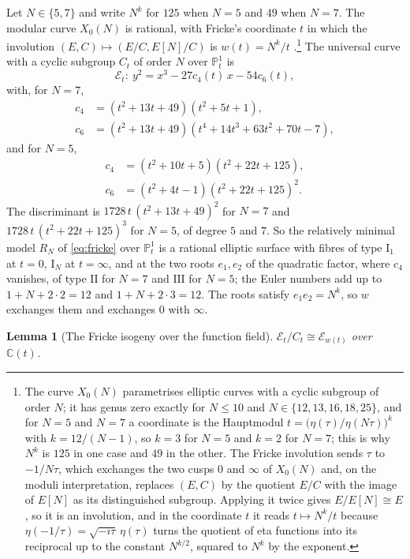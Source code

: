 \documentclass[11pt,reqno]{amsart}
\numberwithin{equation}{section}
\theoremstyle{plain}
\newtheorem{lemma}[theorem]{Lemma}
\theoremstyle{definition}
\newcommand{\CC}{\mathbb{C}}
\newcommand{\PP}{\mathbb{P}}
\begin{document}
Let $N\in\{5,7\}$ and write $N^{k}$ for $125$ when $N=5$ and $49$ when $N=7$. The modular curve $X_{0}(N)$ is rational, with Fricke's coordinate $t$ in which the involution $(E,C)\mapsto(E/C,E[N]/C)$ is $w(t)=N^{k}/t$ \cite[\S7.6]{vGS25}.\footnote{The curve $X_{0}(N)$ parametrises elliptic curves with a cyclic subgroup of order $N$; it has genus zero exactly for $N\le10$ and $N\in\{12,13,16,18,25\}$, and for $N=5$ and $N=7$ a coordinate is the Hauptmodul $t=\bigl(\eta(\tau)/\eta(N\tau)\bigr)^{k}$ with $k=12/(N-1)$, so $k=3$ for $N=5$ and $k=2$ for $N=7$; this is why $N^{k}$ is $125$ in one case and $49$ in the other. The Fricke involution sends $\tau$ to $-1/N\tau$, which exchanges the two cusps $0$ and $\infty$ of $X_{0}(N)$ and, on the moduli interpretation, replaces $(E,C)$ by the quotient $E/C$ with the image of $E[N]$ as its distinguished subgroup. Applying it twice gives $E/E[N]\cong E$, so it is an involution, and in the coordinate $t$ it reads $t\mapsto N^{k}/t$ because $\eta(-1/\tau)=\sqrt{-i\tau}\,\eta(\tau)$ turns the quotient of eta functions into its reciprocal up to the constant $N^{k/2}$, squared to $N^{k}$ by the exponent.} The universal curve with a cyclic subgroup $C_{t}$ of order $N$ over $\PP^{1}_{t}$ is
\begin{equation}\label{eq:fricke}
\mathcal{E}_{t}\colon\ y^{2}=x^{3}-27c_{4}(t)\,x-54c_{6}(t),
\end{equation}
with, for $N=7$,
\begin{align*}
c_{4}&=(t^{2}+13t+49)(t^{2}+5t+1),\\
c_{6}&=(t^{2}+13t+49)(t^{4}+14t^{3}+63t^{2}+70t-7),
\end{align*}
and for $N=5$,
\begin{align*}
c_{4}&=(t^{2}+10t+5)(t^{2}+22t+125),\\
c_{6}&=(t^{2}+4t-1)(t^{2}+22t+125)^{2}.
\end{align*}
The discriminant is $1728\,t\,(t^{2}+13t+49)^{2}$ for $N=7$ and $1728\,t\,(t^{2}+22t+125)^{3}$ for $N=5$, of degree $5$ and $7$. So the relatively minimal model $R_{N}$ of \eqref{eq:fricke} over $\PP^{1}_{t}$ is a rational elliptic surface with fibres of type $\mathrm{I}_{1}$ at $t=0$, $\mathrm{I}_{N}$ at $t=\infty$, and at the two roots $e_{1},e_{2}$ of the quadratic factor, where $c_{4}$ vanishes, of type $\mathrm{II}$ for $N=7$ and $\mathrm{III}$ for $N=5$; the Euler numbers add up to $1+N+2\cdot2=12$ and $1+N+2\cdot3=12$. The roots satisfy $e_{1}e_{2}=N^{k}$, so $w$ exchanges them and exchanges $0$ with $\infty$.

\begin{lemma}[The Fricke isogeny over the function field]\label{lem:fricke}
$\mathcal{E}_{t}/C_{t}\cong\mathcal{E}_{w(t)}$ over $\CC(t)$.
\end{lemma}
\end{document}
